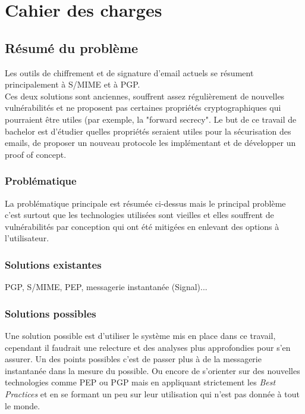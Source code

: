 \chapter{Cahier des charges}


\section*{Résumé du problème}
Les outils de chiffrement et de signature d'email actuels se résument principalement à S/MIME et à PGP. \\
Ces deux solutions sont anciennes, souffrent assez régulièrement de nouvelles vulnérabilités et ne proposent pas certaines propriétés cryptographiques qui pourraient être utiles (par exemple, la "forward secrecy". Le but de ce travail de bachelor est d'étudier quelles propriétés seraient utiles pour la sécurisation des emails, de proposer un nouveau protocole les implémentant et de développer un proof of concept. 
\subsection*{Problématique}
La problématique principale est résumée ci-dessus mais le principal problème c'est surtout que les technologies utilisées sont vieilles et elles souffrent de vulnérabilités par conception qui ont été mitigées en enlevant des options à l'utilisateur.
\subsection*{Solutions existantes}
PGP, S/MIME, PEP, messagerie instantanée (Signal)...
\subsection*{Solutions possibles}
Une solution possible est d'utiliser le système mis en place dans ce travail, cependant il faudrait une relecture et des analyses plus approfondies pour s'en assurer.
Un des points possibles c'est de passer plus à de la messagerie instantanée dans la mesure du possible.
Ou encore de s'orienter sur des nouvelles technologies comme PEP ou PGP mais en appliquant strictement les \textit{Best Practices} et en se formant un peu sur leur utilisation qui n'est pas donnée à tout le monde.
